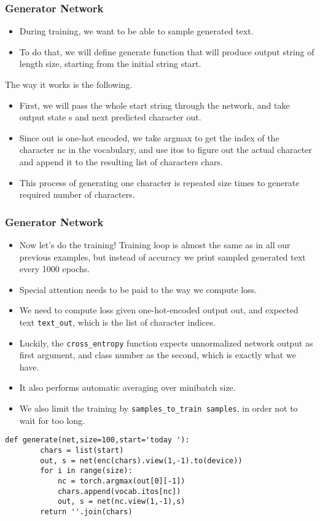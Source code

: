 \begin{frame}[fragile] \frametitle{Generator Network}

\begin{itemize}
\item During training, we want to be able to sample generated text. 
\item To do that, we will define generate function that will produce output string of length size, starting from the initial string start.
\end{itemize}

The way it works is the following. 

\begin{itemize}
\item First, we will pass the whole start string through the network, and take output state s and next predicted character out. 
\item Since out is one-hot encoded, we take argmax to get the index of the character nc in the vocabulary, and use itos to figure out the actual character and append it to the resulting list of characters chars. 
\item This process of generating one character is repeated size times to generate required number of characters.
\end{itemize}
\end{frame}

\begin{frame}[fragile] \frametitle{Generator Network}

\begin{itemize}
\item Now let's do the training! Training loop is almost the same as in all our previous examples, but instead of accuracy we print sampled generated text every 1000 epochs.
\item Special attention needs to be paid to the way we compute loss. 
\item We need to compute loss given one-hot-encoded output out, and expected text \lstinline|text_out|, which is the list of character indices. 
\item Luckily, the \lstinline|cross_entropy| function expects unnormalized network output as first argument, and class number as the second, which is exactly what we have. 
\item It also performs automatic averaging over minibatch size.
\item We also limit the training by \lstinline|samples_to_train samples|, in order not to wait for too long.
\end{itemize}


\begin{lstlisting}
def generate(net,size=100,start='today '):
        chars = list(start)
        out, s = net(enc(chars).view(1,-1).to(device))
        for i in range(size):
            nc = torch.argmax(out[0][-1])
            chars.append(vocab.itos[nc])
            out, s = net(nc.view(1,-1),s)
        return ''.join(chars)
\end{lstlisting}




\end{frame}

